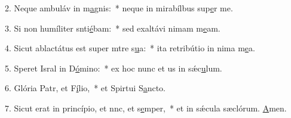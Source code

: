 2. Neque ambuláv in m\uline{a}gnis:~* neque in mirabílbus sup\uline{e}r me.\par 
3. Si non humíliter snti\uline{é}bam:~* sed exaltávi nimam m\uline{e}am.\par 
4. Sicut ablactátus est super mtre s\uline{u}a:~* ita retribútio in nima m\uline{e}a.\par 
5. Speret Isral in D\uline{ó}mino:~* ex hoc nunc et us in sǽc\uline{u}lum.\par 
6. Glória Patr, et F\uline{í}lio,~* et Spirtui S\uline{a}ncto.\par 
7. Sicut erat in princípio, et nnc, et s\uline{e}mper,~* et in sǽcula sæclórum. \uline{A}men.\par 
